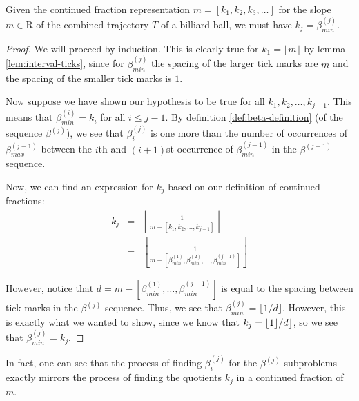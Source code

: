 \begin{theorem}
  Given the continued fraction representation $m = [k_1, k_2, k_3, \ldots]$ for the slope $m \in \mathrm{R}$ of the combined trajectory $T$ of a billiard ball, we must have $k_j = \beta_{min}^{(j)}$.
\end{theorem}
\begin{proof}
  We will proceed by induction. This is clearly true for $k_1 = \lfloor m \rfloor$ by lemma \ref{lem:interval-ticks}, since for $\beta_{min}^{(j)}$ the spacing of the larger tick marks are $m$ and the spacing of the smaller tick marks is $1$.

  Now suppose we have shown our hypothesis to be true for all $k_1, k_2, \ldots, k_{j-1}$. This means that $\beta_{min}^{(i)} = k_{i}$ for all $i \leq j-1$. By definition \ref{def:beta-definition} (of the sequence $\beta^{(j)}$), we see that $\beta_i^{(j)}$ is one more than the number of occurrences of $\beta^{(j-1)}_{max}$ between the $i$th and $(i+1)$st occurrence of $\beta^{(j-1)}_{min}$ in the $\beta^{(j-1)}$ sequence.

  Now, we can find an expression for $k_{j}$ based on our definition of continued fractions:
  \begin{eqnarray}
    k_j &=& \left\lfloor \frac{1}{m - [k_1, k_2, \ldots, k_{j-1}]} \right\rfloor \\
        &=& \left\lfloor \frac{1}{m - [\beta_{min}^{(1)}, \beta_{min}^{(2)}, \ldots, \beta_{min}^{(j-1)}]} \right\rfloor
  \end{eqnarray}

  However, notice that $d = m - [\beta_{min}^{(1)}, \ldots, \beta_{min}^{(j-1)}]$ is equal to the spacing between tick marks in the $\beta^{(j)}$ sequence. Thus, we see that $\beta_{min}^{(j)} = \lfloor 1/d \rfloor$. However, this is exactly what we wanted to show, since we know that $k_j = \floor 1/d \rfloor$, so we see that $\beta_{min}^{(j)} = k_j$.
\end{proof}

In fact, one can see that the process of finding $\beta^{(j)}_i$ for the $\beta^{(j)}$ subproblems exactly mirrors the process of finding the quotients $k_j$ in a continued fraction of $m$.
